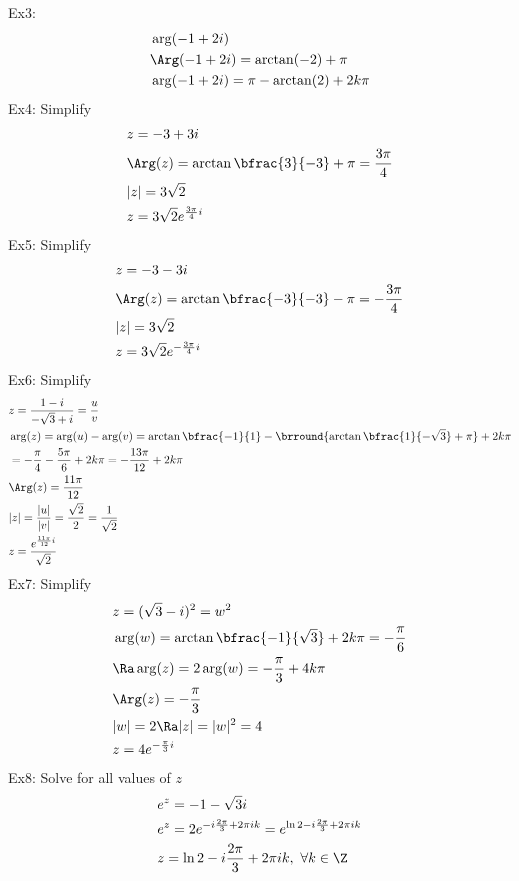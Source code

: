 Ex3:
\begin{align*}
    &\arg(-1+2i)\\
    &\Arg(-1+2i)=\arctan(-2)+\pi\\
    &\arg(-1+2i)=\pi-\arctan(2)+2k\pi
\end{align*}
Ex4: Simplify
\begin{align*}
    &z=-3+3i\\
    &\Arg(z)=\arctan\bfrac{3}{-3}+\pi=\frac{3\pi}{4}\\
    &|z|=3\sqrt{2}\\
    &z=3\sqrt{2}e^{\frac{3\pi}{4}i}
\end{align*}
Ex5: Simplify
\begin{align*}
    &z=-3-3i\\
    &\Arg(z)=\arctan\bfrac{-3}{-3}-\pi=-\frac{3\pi}{4}\\
    &|z|=3\sqrt{2}\\
    &z=3\sqrt{2}e^{-\frac{3\pi}{4}i}
\end{align*}
Ex6: Simplify
\begin{align*}
    &z=\frac{1-i}{-\sqrt{3}+i}=\frac{u}{v}\\
    &\arg(z)=\arg(u)-\arg(v)=\arctan\bfrac{-1}{1}-\brround{\arctan\bfrac{1}{-\sqrt{3}}+\pi}+2k\pi\\
    &=-\frac{\pi}{4}-\frac{5\pi}{6}+2k\pi=-\frac{13\pi}{12}+2k\pi\\
    &\Arg(z)=\frac{11\pi}{12}\\
    &|z|=\frac{|u|}{|v|}=\frac{\sqrt{2}}{2}=\frac{1}{\sqrt{2}}\\
    &z=\frac{e^{\frac{11\pi}{12}i}}{\sqrt{2}}
\end{align*}
Ex7: Simplify
\begin{align*}
    &z=(\sqrt{3}-i)^2=w^2\\
    &\arg(w)=\arctan\bfrac{-1}{\sqrt{3}}+2k\pi=-\frac{\pi}{6}\\
    &\Ra \arg(z)=2\arg(w)=-\frac{\pi}{3}+4k\pi\\
    &\Arg(z)=-\frac{\pi}{3}\\
    &|w|=2\Ra |z|=|w|^2=4\\
    &z=4e^{-\frac{\pi}{3}i}
\end{align*}
Ex8: Solve for all values of $z$
\begin{align*}
    &e^z=-1-\sqrt{3}i\\
    &e^z=2e^{-i\frac{2\pi}{3}+2\pi ik}=e^{\ln 2-i\frac{2\pi}{3}+2\pi ik}\\
    &z=\ln2-i\frac{2\pi}{3}+2\pi ik,\ \forall k\in\Z
\end{align*}

